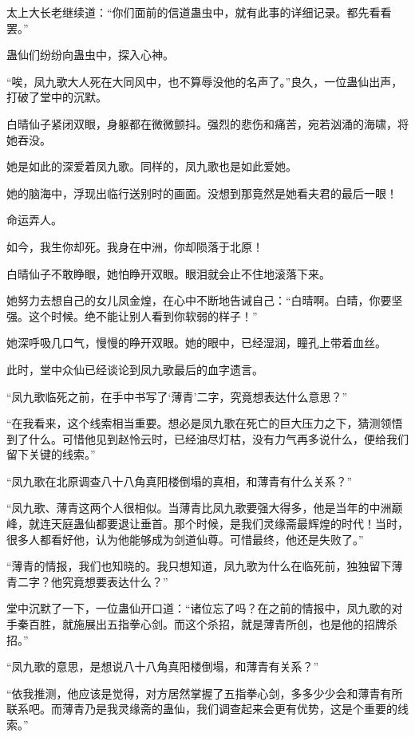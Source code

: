 \begin{this_body}
太上大长老继续道：“你们面前的信道蛊虫中，就有此事的详细记录。都先看看罢。”

蛊仙们纷纷向蛊虫中，探入心神。

“唉，凤九歌大人死在大同风中，也不算辱没他的名声了。”良久，一位蛊仙出声，打破了堂中的沉默。

白晴仙子紧闭双眼，身躯都在微微颤抖。强烈的悲伤和痛苦，宛若汹涌的海啸，将她吞没。

她是如此的深爱着凤九歌。同样的，凤九歌也是如此爱她。

她的脑海中，浮现出临行送别时的画面。没想到那竟然是她看夫君的最后一眼！

命运弄人。

如今，我生你却死。我身在中洲，你却陨落于北原！

白晴仙子不敢睁眼，她怕睁开双眼。眼泪就会止不住地滚落下来。

她努力去想自己的女儿凤金煌，在心中不断地告诫自己：“白晴啊。白晴，你要坚强。这个时候。绝不能让别人看到你软弱的样子！”

她深呼吸几口气，慢慢的睁开双眼。她的眼中，已经湿润，瞳孔上带着血丝。

此时，堂中众仙已经谈论到凤九歌最后的血字遗言。

“凤九歌临死之前，在手中书写了‘薄青’二字，究竟想表达什么意思？”

“在我看来，这个线索相当重要。想必是凤九歌在死亡的巨大压力之下，猜测领悟到了什么。可惜他见到赵怜云时，已经油尽灯枯，没有力气再多说什么，便给我们留下关键的线索。”

“凤九歌在北原调查八十八角真阳楼倒塌的真相，和薄青有什么关系？”

“凤九歌、薄青这两个人很相似。当薄青比凤九歌要强大得多，他是当年的中洲巅峰，就连天庭蛊仙都要退让垂首。那个时候，是我们灵缘斋最辉煌的时代！当时，很多人都看好他，认为他能够成为剑道仙尊。可惜最终，他还是失败了。”

“薄青的情报，我们也知晓的。我只想知道，凤九歌为什么在临死前，独独留下薄青二字？他究竟想要表达什么？”

堂中沉默了一下，一位蛊仙开口道：“诸位忘了吗？在之前的情报中，凤九歌的对手秦百胜，就施展出五指拳心剑。而这个杀招，就是薄青所创，也是他的招牌杀招。”

“凤九歌的意思，是想说八十八角真阳楼倒塌，和薄青有关系？”

“依我推测，他应该是觉得，对方居然掌握了五指拳心剑，多多少少会和薄青有所联系吧。而薄青乃是我灵缘斋的蛊仙，我们调查起来会更有优势，这是个重要的线索。”


\end{this_body}
